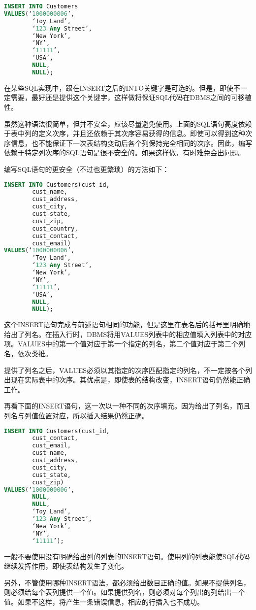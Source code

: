 \begin{lstlisting}[language=SQL]
INSERT INTO Customers
VALUES(‘1000000006’,
		‘Toy Land’,
		‘123 Any Street’,
		‘New York’,
		‘NY’,
		‘11111’,
		‘USA’,
		NULL,
		NULL);
\end{lstlisting}

在某些SQL实现中，跟在INSERT之后的INTO关键字是可选的。但是，即使不一定需要，最好还是提供这个关键字，这样做将保证SQL代码在DBMS之间的可移植性。

虽然这种语法很简单，但并不安全，应该尽量避免使用。上面的SQL语句高度依赖于表中列的定义次序，并且还依赖于其次序容易获得的信息。即使可以得到这种次序信息，也不能保证下一次表结构变动后各个列保持完全相同的次序。因此，编写依赖于特定列次序的SQL语句是很不安全的。如果这样做，有时难免会出问题。

编写SQL语句的更安全（不过也更繁琐）的方法如下：

\begin{lstlisting}[language=SQL]
INSERT INTO Customers(cust_id,
		cust_name,
		cust_address,
		cust_city,
		cust_state,
		cust_zip,
		cust_country,
		cust_contact,
		cust_email)
VALUES(‘1000000006’,
		‘Toy Land’,
		‘123 Any Street’,
		‘New York’,
		‘NY’,
		‘11111’,
		‘USA’,
		NULL,
		NULL);
\end{lstlisting}

这个INSERT语句完成与前述语句相同的功能，但是这里在表名后的括号里明确地给出了列名。在插入行时，DBMS将用VALUES列表中的相应值填入列表中的对应项。VALUES中的第一个值对应于第一个指定的列名，第二个值对应于第二个列名，依次类推。

提供了列名之后，VALUES必须以其指定的次序匹配指定的列名，不一定按各个列出现在实际表中的次序。其优点是，即使表的结构改变，INSERT语句仍然能正确工作。

再看下面的INSERT语句，这一次以一种不同的次序填充。因为给出了列名，而且列名与列值位置对应，所以插入结果仍然正确。

\begin{lstlisting}[language=SQL]
INSERT INTO Customers(cust_id,
		cust_contact,
		cust_email,
		cust_name,
		cust_address,
		cust_city,
		cust_state,
		cust_zip)
VALUES(‘1000000006’,
		NULL,
		NULL,
		‘Toy Land’,
		‘123 Any Street’,
		‘New York’,
		‘NY’,
		‘11111’);
\end{lstlisting}

一般不要使用没有明确给出列的列表的INSERT语句。使用列的列表能使SQL代码继续发挥作用，即使表结构发生了变化。

另外，不管使用哪种INSERT语法，都必须给出数目正确的值。如果不提供列名，则必须给每个表列提供一个值。如果提供列名，则必须对每个列出的列给出一个值。如果不这样，将产生一条错误信息，相应的行插入也不成功。


